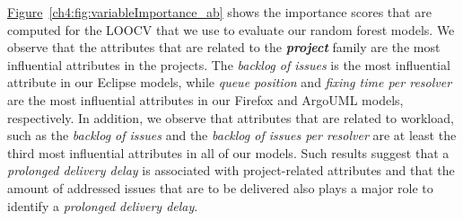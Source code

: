 \hyperref[ch4:fig:variableImportance_ab]{Figure}~\ref{ch4:fig:variableImportance_ab}
shows the importance scores that are computed for the LOOCV that we use to
evaluate our random forest models. We observe that the attributes that are
related to the \textit{\textbf{project}} family are the most influential
attributes in the projects. The \textit{backlog of issues} is the most
influential attribute in our Eclipse models, while \textit{queue position} and
\textit{fixing time per resolver} are the most influential attributes in our
Firefox and ArgoUML models, respectively. In addition, we observe that
attributes that are related to workload, such as the \textit{backlog of issues}
and the \textit{backlog of issues per resolver} are at least the third most
influential attributes in all of our models. Such results suggest that a
\textit{prolonged delivery delay} is associated with project-related attributes and
that the amount of addressed issues that are to be delivered also plays a major
role to identify a \textit{prolonged delivery delay}. \\


